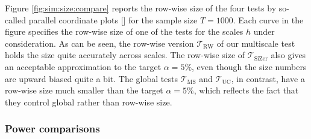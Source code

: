 Figure \ref{fig:sim:size:compare} reports the row-wise size of the four tests by so-called parallel coordinate plots [\cite{Inselberg1985}] for the sample size $T=1000$. Each curve in the figure specifies the row-wise size of one of the tests for the scales $h$ under consideration. As can be seen, the row-wise version $\mathcal{T}_{\text{RW}}$ of our multiscale test holds the size quite accurately across scales. 
The row-wise size of $\mathcal{T}_{\text{SiZer}}$ also gives an acceptable approximation to the target $\alpha=5\%$, even though the size numbers are upward biased quite a bit. The global tests $\mathcal{T}_{\text{MS}}$ and $\mathcal{T}_{\text{UC}}$, in contrast, have a row-wise size much smaller than the target $\alpha=5\%$, which reflects the fact that they control global rather than row-wise size. 


\subsubsection{Power comparisons}\label{subsec-sim-multiscale-power}


